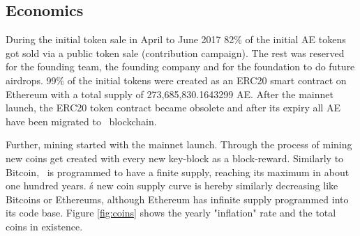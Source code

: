 \subsection{Economics}
During the initial token sale in April to June 2017 82\% of the initial AE tokens got sold via a public token sale (contribution campaign). The rest was reserved for the founding team, the founding company and for the foundation to do future airdrops. 99\% of the initial tokens were created as an ERC20 smart contract on Ethereum with a total supply of 273,685,830.1643299 AE. After the mainnet launch, the ERC20 token contract became obsolete and after its expiry all AE have been migrated to \aet\ blockchain. 


Further, mining started with the mainnet launch. Through the process of mining new coins get created with every new key-block as a block-reward. Similarly to Bitcoin, \aet\ is programmed to have a finite supply, reaching its maximum in about one hundred years. \aet\'s new coin supply curve is hereby similarly decreasing like Bitcoins or Ethereums, although Ethereum has infinite supply programmed into its code base. 
Figure \ref{fig:coins} shows the yearly "inflation" rate and the total coins in existence.

